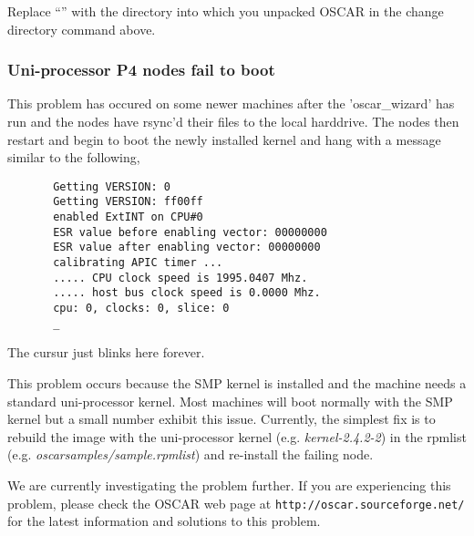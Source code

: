 Replace ``'' with the directory into which you unpacked
\endchange
OSCAR in the change directory command above.

\subsubsection{Uni-processor P4 nodes fail to boot}
\begchange
This problem has occured on some newer machines after the 'oscar\_wizard' 
has run and the nodes have rsync'd their files to the local harddrive. 
The nodes then restart and begin to boot the newly installed kernel
and hang with a message similar to the following,
\begin{verbatim}
       Getting VERSION: 0
       Getting VERSION: ff00ff
       enabled ExtINT on CPU#0
       ESR value before enabling vector: 00000000
       ESR value after enabling vector: 00000000
       calibrating APIC timer ...
       ..... CPU clock speed is 1995.0407 Mhz.
       ..... host bus clock speed is 0.0000 Mhz.
       cpu: 0, clocks: 0, slice: 0
       _
\end{verbatim}
The cursur just blinks here forever.

This problem occurs because the SMP kernel is installed and the
machine needs a standard uni-processor kernel.  Most machines will boot
normally with the SMP kernel but a small number exhibit this issue.
Currently, the simplest fix is to rebuild the image with the
uni-processor kernel (e.g. \emph{kernel-2.4.2-2}) in the rpmlist 
(e.g. \emph{oscarsamples/sample.rpmlist}) and re-install the failing node.  

We are currently investigating the problem further.  If you are experiencing 
this problem, please check the OSCAR web page at
{\tt http://oscar.sourceforge.net/} for the latest information and solutions
to this problem.

